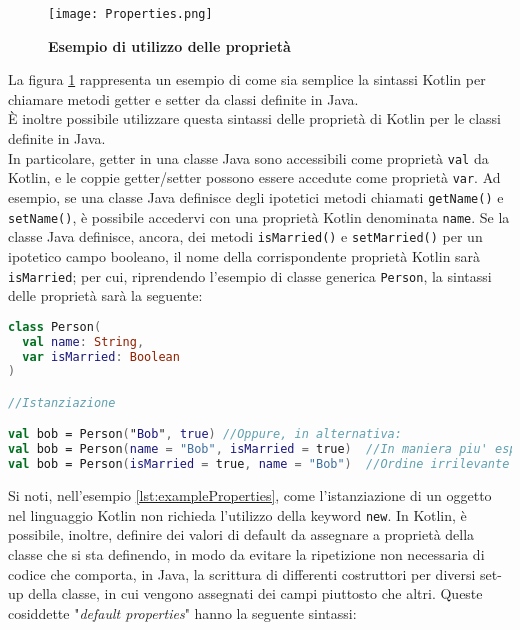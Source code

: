 \begin{figure}[ht]
  \centering
  \texttt{[image: Properties.png]}
  \caption{{\bfseries Esempio di utilizzo delle proprietà}}
  \label{KotlinProperties}
\end{figure}

La figura \ref{KotlinProperties} rappresenta un esempio di come sia semplice la sintassi Kotlin per chiamare metodi getter e setter da classi definite in Java.\\

È inoltre possibile utilizzare questa sintassi delle proprietà di Kotlin per le classi definite in Java.\\
In particolare, getter in una classe Java sono accessibili come proprietà \texttt{val} da Kotlin, e le coppie getter/setter possono essere accedute come proprietà \texttt{var}. Ad esempio, se una classe Java definisce degli ipotetici metodi chiamati \texttt{getName()} e \texttt{setName()}, è possibile accedervi con una proprietà Kotlin denominata \texttt{name}. Se la classe Java definisce, ancora, dei metodi \texttt{isMarried()} e \texttt{setMarried()} per un ipotetico campo booleano, il nome della corrispondente proprietà Kotlin sarà \texttt{isMarried}; per cui, riprendendo l'esempio di classe generica \texttt{Person}, la sintassi delle proprietà sarà la seguente:\\

\begin{lstlisting}[caption={Utilizzo delle proprietà di una classe Kotlin}, captionpos=b, label={lst:exampleProperties}, language=Kotlin]
class Person(
  val name: String,
  var isMarried: Boolean
)

//Istanziazione

val bob = Person("Bob", true) //Oppure, in alternativa:
val bob = Person(name = "Bob", isMarried = true)  //In maniera piu' espressiva
val bob = Person(isMarried = true, name = "Bob")  //Ordine irrilevante con questa sintassi
\end{lstlisting}

Si noti, nell'esempio \ref{lst:exampleProperties}, come l'istanziazione di un oggetto nel linguaggio Kotlin non richieda l'utilizzo della keyword \texttt{new}. In Kotlin, è possibile, inoltre, definire dei valori di default da assegnare a proprietà della classe che si sta definendo, in modo da evitare la ripetizione non necessaria di codice che comporta, in Java, la scrittura di differenti costruttori per diversi set-up della classe, in cui vengono assegnati dei campi piuttosto che altri. Queste cosiddette "{\em default properties}" hanno la seguente sintassi:\\

